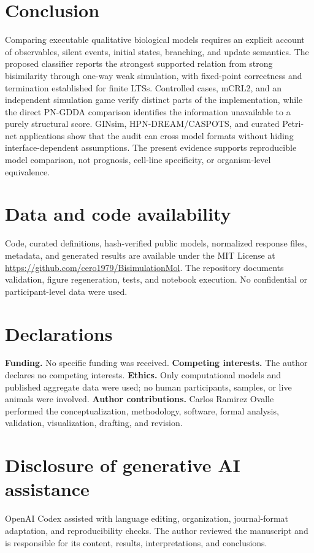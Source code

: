 \documentclass{ws-jbcb}
\numberwithin{equation}{section}
\begin{document}
\section{Conclusion}\label{sec:conclusion}

Comparing executable qualitative biological models requires an explicit account
of observables, silent events, initial states, branching, and update semantics.
The proposed classifier reports the strongest supported relation from strong
bisimilarity through one-way weak simulation, with fixed-point correctness and
termination established for finite LTSs. Controlled cases, mCRL2, and an
independent simulation game verify distinct parts of the implementation, while
the direct PN-GDDA comparison identifies the information unavailable to a purely
structural score. GINsim, HPN-DREAM/CASPOTS, and curated Petri-net applications
show that the audit can cross model formats without hiding interface-dependent
assumptions. The present evidence supports reproducible model comparison, not
prognosis, cell-line specificity, or organism-level equivalence.

\section*{Data and code availability}

Code, curated definitions, hash-verified public models, normalized response
files, metadata, and generated results are available under the MIT License at
\url{https://github.com/cero1979/BisimulationMol}. The repository documents
validation, figure regeneration, tests, and notebook execution. No confidential
or participant-level data were used.

\section*{Declarations}

\noindent\textbf{Funding.} No specific funding was received.
\textbf{Competing interests.} The author declares no competing interests.
\textbf{Ethics.} Only computational models and published aggregate data were
used; no human participants, samples, or live animals were involved.
\textbf{Author contributions.} Carlos Ramirez Ovalle performed the
conceptualization, methodology, software, formal analysis, validation,
visualization, drafting, and revision.

\section*{Disclosure of generative AI assistance}

OpenAI Codex assisted with language editing, organization, journal-format
adaptation, and reproducibility checks. The author reviewed the manuscript and
is responsible for its content, results, interpretations, and conclusions.



\end{document}
